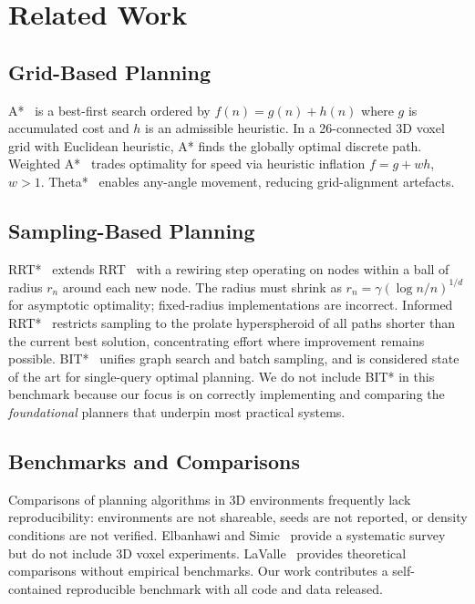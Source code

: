 \documentclass[10pt,twocolumn]{article}
\begin{document}
\section{Related Work}\label{sec:related}

\subsection{Grid-Based Planning}
A*~\cite{hart1968} is a best-first search ordered by $f(n)=g(n)+h(n)$
where $g$ is accumulated cost and $h$ is an admissible heuristic.
In a 26-connected 3D voxel grid with Euclidean heuristic, A* finds the
globally optimal discrete path.
Weighted A*~\cite{pohl1970} trades optimality for speed via heuristic
inflation $f=g+wh$, $w>1$.
Theta*~\cite{daniel2010} enables any-angle movement, reducing
grid-alignment artefacts.

\subsection{Sampling-Based Planning}
RRT*~\cite{karaman2011} extends RRT~\cite{lavalle1998} with a rewiring
step operating on nodes within a ball of radius $r_n$ around each new
node.
The radius must shrink as $r_n = \gamma(\log n/n)^{1/d}$ for
asymptotic optimality; fixed-radius implementations are incorrect.
Informed RRT*~\cite{gammell2014} restricts sampling to the prolate
hyperspheroid of all paths shorter than the current best solution,
concentrating effort where improvement remains possible.
BIT*~\cite{gammell2015} unifies graph search and batch sampling, and is
considered state of the art for single-query optimal planning.
We do not include BIT* in this benchmark because our focus is on
correctly implementing and comparing the \emph{foundational} planners
that underpin most practical systems.

\subsection{Benchmarks and Comparisons}
Comparisons of planning algorithms in 3D environments frequently lack
reproducibility: environments are not shareable, seeds are not reported,
or density conditions are not verified.
Elbanhawi and Simic~\cite{elbanhawi2014} provide a systematic survey
but do not include 3D voxel experiments.
LaValle~\cite{lavalle2006} provides theoretical comparisons without
empirical benchmarks.
Our work contributes a self-contained reproducible benchmark with
all code and data released.
\end{document}
